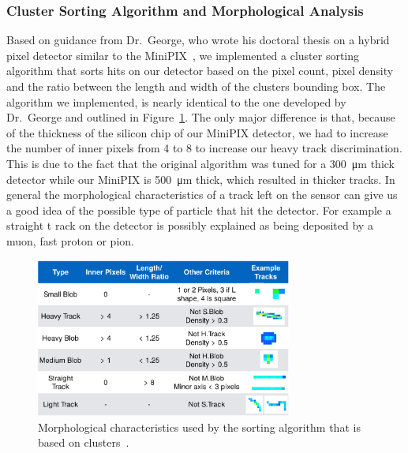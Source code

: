 {\subsubsection{Cluster Sorting Algorithm and Morphological Analysis}

Based on guidance from Dr.~George, who wrote his doctoral thesis on a hybrid pixel detector similar to the MiniPIX~\cite{stuartalgo}, we implemented a cluster sorting algorithm that sorts hits on our detector based on the pixel count, pixel density and the ratio between the length and width of the clusters bounding box. The algorithm we implemented, is nearly identical to the one developed by Dr.~George and outlined in Figure~\ref{fig:sortingalgo}. The only major difference is that, because of the thickness of the silicon chip of our MiniPIX detector, we had to increase the number of inner pixels from \num{4} to \num{8} to increase our heavy track discrimination. This is due to the fact that the original algorithm was tuned for a \SI{300}{\micro\meter} thick detector while our MiniPIX is \SI{500}{\micro\meter} thick, which resulted in thicker tracks. In general the morphological characteristics of a track left on the sensor can give us a good idea of the possible type of particle that hit the detector. For example a straight t rack on the detector is possibly explained as being deposited by a muon, fast proton or pion.

	\begin{figure}[h!]
 	\begin{center}
 	\includegraphics[width=0.75\textwidth]{./Figures/stuartgraphic.pdf}
 	\caption{Morphological characteristics used by the sorting algorithm that is based on clusters~\cite{stuartalgo}.}
 	\label{fig:sortingalgo}
 	\end{center}
 	\end{figure}
\newpage


}
